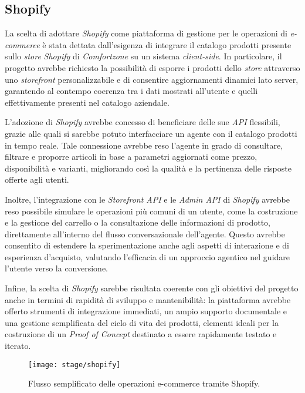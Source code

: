 \subsection{Shopify}

La scelta di adottare \emph{Shopify} come piattaforma di gestione per le operazioni di \emph{e-commerce} è stata dettata dall’esigenza di integrare il catalogo prodotti presente 
sullo \emph{store} \emph{Shopify} di \emph{Comfortzone} su un sistema \emph{client-side}. In particolare, il progetto avrebbe richiesto la possibilità di esporre i prodotti dello \emph{store} 
attraverso uno \emph{storefront} personalizzabile e di consentire aggiornamenti dinamici lato server, garantendo al contempo coerenza tra i dati mostrati all’utente e quelli effettivamente 
presenti nel catalogo aziendale.

L’adozione di \emph{Shopify} avrebbe concesso di beneficiare delle sue \emph{API} flessibili, grazie alle quali si sarebbe potuto interfacciare un agente con il catalogo prodotti in tempo reale. 
Tale connessione avrebbe reso l’agente in grado di consultare, filtrare e proporre articoli in base a parametri aggiornati come prezzo, disponibilità e varianti, 
migliorando così la qualità e la pertinenza delle risposte offerte agli utenti.

Inoltre, l’integrazione con le \emph{Storefront API} e le \emph{Admin API} di \emph{Shopify} avrebbe reso possibile simulare le operazioni più comuni di un utente, come la 
costruzione e la gestione del carrello o la consultazione delle informazioni di prodotto, direttamente all’interno del flusso conversazionale dell’agente. Questo avrebbe consentito di 
estendere la sperimentazione anche agli aspetti di interazione e di esperienza d’acquisto, valutando l’efficacia di un approccio agentico nel guidare l’utente verso la conversione.

Infine, la scelta di \emph{Shopify} sarebbe risultata coerente con gli obiettivi del progetto anche in termini di rapidità di sviluppo e mantenibilità: 
la piattaforma avrebbe offerto strumenti di integrazione immediati, un ampio supporto documentale e una gestione semplificata del ciclo di vita dei prodotti, 
elementi ideali per la costruzione di un \emph{Proof of Concept} destinato a essere rapidamente testato e iterato.

\begin{figure}[H]
    \centering
    \texttt{[image: stage/shopify]}
    \caption{Flusso semplificato delle operazioni e-commerce tramite Shopify.}
    \label{fig:shopify}
\end{figure}